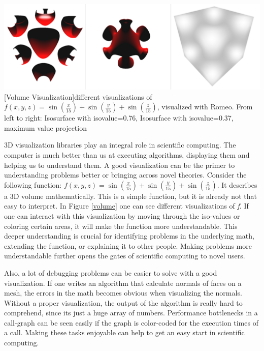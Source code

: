 \vspace{1em}
\begin{minipage}{\linewidth}
    \centering
    \includegraphics[width=0.7\linewidth]{graphics/surfaces.png}
    [Volume Visualization]{different visualizations of $f(x,y,z)=\sin(\frac{x}{15})+\sin(\frac{y}{15})+\sin(\frac{z}{15})$, visualized with Romeo. From left to right: Isosurface with isovalue=0.76, Isosurface with isovalue=0.37, maximum value projection}
    \label{fig:volume}
\end{minipage}
\vspace{1em}

3D visualization libraries play an integral role in scientific computing.
The computer is much better than us at executing algorithms, displaying them and helping us to understand them.
A good visualization can be the primer to understanding problems better or bringing across novel theories.
Consider the following function: $f(x,y,z)=\sin(\frac{x}{15})+\sin(\frac{y}{15})+\sin(\frac{z}{15})$. 
It describes a 3D volume mathematically. 
This is a simple function, but it is already not that easy to interpret. In Figure \cref{volume} one can see different visualizations of \textit{f}.
If one can interact with this visualization by moving through the iso-values or coloring certain areas, it will make the function more understandable.
This deeper understanding is crucial for identifying problems in the underlying math, extending the function, or explaining it to other people. 
Making problems more understandable further opens the gates of scientific computing to novel users.

Also, a lot of debugging problems can be easier to solve with a good visualization. 
If one writes an algorithm that calculate normals of faces on a mesh, the errors in the math becomes obvious when visualizing the normals. Without a proper visualization, the output of the algorithm is really hard to comprehend, since its just a huge array of numbers.
Performance bottlenecks in a call-graph can be seen easily if the graph is color-coded for the execution times of a call. 
Making these tasks enjoyable can help to get an easy start in scientific computing.

